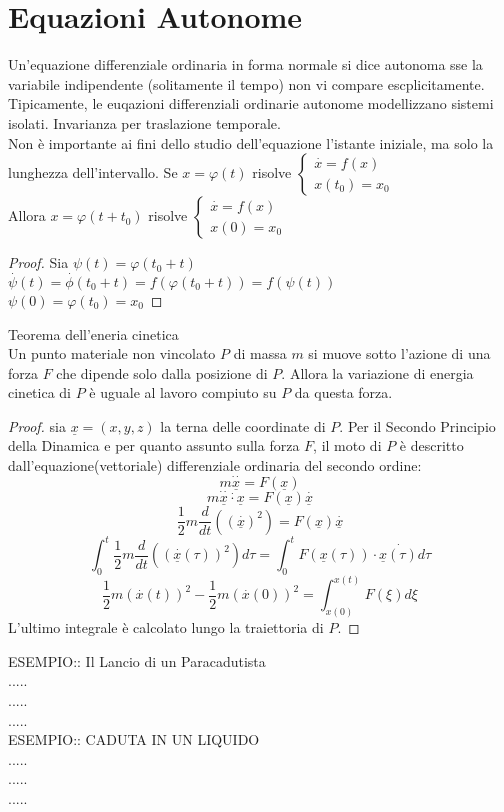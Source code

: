\section{Equazioni Autonome}
Un'equazione differenziale ordinaria in forma normale si dice autonoma sse la variabile indipendente (solitamente il tempo) non vi compare escplicitamente.
\observation
Tipicamente, le euqazioni differenziali ordinarie autonome modellizzano sistemi isolati.
\observation Invarianza per traslazione temporale.\\
Non è importante ai fini dello studio dell'equazione l'istante iniziale, ma solo la lunghezza dell'intervallo.
Se  $x=\varphi(t)$ risolve $\left\{ \begin{matrix} \overset{\cdot}{x} = f(x)\\x(t_0)=x_0 \end{matrix} \right.$\\
Allora $x=\varphi(t+t_0)$ risolve $\left\{ \begin{matrix} \overset{\cdot}{x} = f(x)\\x(0)=x_0 \end{matrix} \right.$\\
\begin{proof}
	Sia $\psi(t)=\varphi(t_0+t)$\\
	$\overset{\cdot}{\psi}(t)=\overset{\cdot}{\phi}(t_0+t)=f(\varphi(t_0+t))=f(\psi(t))$\\
	$\psi(0)=\varphi(t_0)=x_0$ 
\end{proof}
\proposition Teorema dell'eneria cinetica\\
Un punto materiale non vincolato $P$ di massa $m$ si muove sotto l'azione di una forza $F$ che dipende solo dalla posizione di $P$. Allora la variazione di energia cinetica di $P$ è uguale al lavoro compiuto su $P$ da questa forza.
\begin{proof}
	sia $\underline{x}=(x,y,z)$ la terna delle coordinate di $P$. Per il Secondo Principio della Dinamica e per quanto assunto sulla forza $F$, il moto di $P$ è descritto dall'equazione(vettoriale) differenziale ordinaria del secondo ordine:\\
	$$m\overset{\cdot\cdot}{\underline{x}}=F(\underline{x})$$
	$$m\overset{\cdot\cdot}{\underline{x}}\overset{\cdot}\cdot{\underline{x}}=F(\underline{x})\overset{\cdot}{\underline{x}}$$
	$$\frac{1}{2}m\frac{d}{dt}\left(\left(\overset{\cdot}{\underline{x}}\right)^2\right)=F(\underline{x})\overset{\cdot}{\underline{x}}$$
	$$\int_{0}^t\frac{1}{2}m\frac{d}{dt}\left(\left(\overset{\cdot}{\underline{x}}(\tau)\right)^2\right)d\tau=\int_{0}^tF(\underline{x}(\tau))\cdot\overset{\cdot}{\underline{x}(\tau)}d\tau$$
	$$\frac{1}{2}m\left(\overset{\cdot}{x}(t)\right)^2-\frac{1}{2}m\left(\overset{\cdot}{x}(0)\right)^2 = \int_{x(0)}^{x(t)}F(\xi)d\xi$$
	L'ultimo integrale è calcolato lungo la traiettoria di $P$.
\end{proof}
ESEMPIO:: Il Lancio di un Paracadutista\\
.....\\
.....\\
.....\\
ESEMPIO:: CADUTA IN UN LIQUIDO\\
.....\\
.....\\
.....\\
